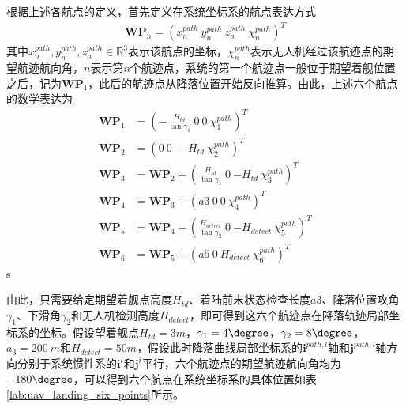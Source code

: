 根据上述各航点的定义，首先定义在系统坐标系的航点表达方式
\begin{align}
\mathbf{WP}_n = (x_n^{path}\ y_n^{path} \ z_n^{path}\ \chi_n^{path})^T
\end{align}
其中$x_n^{path}, y_n^{path}, z_n^{path} \in \mathbb{R}^3$表示该航点的坐标，$\chi_n^{path}$表示无人机经过该航迹点的期望航迹航向角，$n$表示第$n$个航迹点，系统的第一个航迹点一般位于期望着舰位置之后，记为$\mathbf{WP}_1$，此后的航迹点从降落位置开始反向推算。由此，上述六个航点的数学表达为
\begin{align}
\mathbf{WP}_1 &= (-\frac{H_{td}}{\tan{\gamma_1}}\ 0 \ 0\ \chi_1^{path})^T \\
\mathbf{WP}_2 &= (0\ 0 \ -H_{td}\ \chi_2^{path})^T \\
\mathbf{WP}_3 &= \mathbf{WP}_2 + (\frac{H_{td}}{\tan{\gamma_1}}\ 0 \ {-H_{td}}\ \chi_3^{path})^T\\
\mathbf{WP}_4 &= \mathbf{WP}_3+ (a3 \ 0 \ 0\ \chi_4^{path})^T \\
\mathbf{WP}_5 &= \mathbf{WP}_4 + (\frac{H_{detect}}{\tan{\gamma_2}}\ 0 \ {-H_{detect}}\ \chi_5^{path})^T \\
\mathbf{WP}_6 &= \mathbf{WP}_5 + (a5\ 0 \ H_{detect}\ \chi_6^{path})^T 
\end{align}s

由此，只需要给定期望着舰点高度$H_{td}$、着陆前末状态检查长度$a3$、降落位置攻角$\gamma_1$、下滑角$\gamma_2$和无人机检测高度$H_{detect}$，即可得到这六个航迹点在降落轨迹局部坐标系的坐标。假设望着舰点$H_{td} = 3 m$，$\gamma_1=4 \degree$，$\gamma_2=8\degree$，$a_3 = 200\ m$和$H_{detect} = 50 m$，假设此时降落曲线局部坐标系的$\mathbf{i}^{path,l}$轴和$\mathbf{j}^{path,l}$轴方向分别于系统惯性系的$\mathbf{i}^{i}$和$\mathbf{j}^i$平行，六个航迹点的期望航迹航向角均为$-180\degree$，可以得到六个航点在系统坐标系的具体位置如表\ref{lab:uav_landing_six_points}所示。

